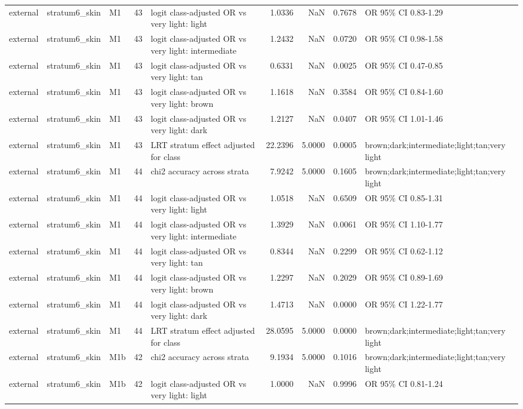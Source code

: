 \begin{tabular}{lllrlrrrl}
external & stratum6\_skin & M1 & 43 & logit class-adjusted OR vs very light: light & 1.0336 & NaN & 0.7678 & OR 95\% CI 0.83-1.29 \\
external & stratum6\_skin & M1 & 43 & logit class-adjusted OR vs very light: intermediate & 1.2432 & NaN & 0.0720 & OR 95\% CI 0.98-1.58 \\
external & stratum6\_skin & M1 & 43 & logit class-adjusted OR vs very light: tan & 0.6331 & NaN & 0.0025 & OR 95\% CI 0.47-0.85 \\
external & stratum6\_skin & M1 & 43 & logit class-adjusted OR vs very light: brown & 1.1618 & NaN & 0.3584 & OR 95\% CI 0.84-1.60 \\
external & stratum6\_skin & M1 & 43 & logit class-adjusted OR vs very light: dark & 1.2127 & NaN & 0.0407 & OR 95\% CI 1.01-1.46 \\
external & stratum6\_skin & M1 & 43 & LRT stratum effect adjusted for class & 22.2396 & 5.0000 & 0.0005 & brown;dark;intermediate;light;tan;very light \\
external & stratum6\_skin & M1 & 44 & chi2 accuracy across strata & 7.9242 & 5.0000 & 0.1605 & brown;dark;intermediate;light;tan;very light \\
external & stratum6\_skin & M1 & 44 & logit class-adjusted OR vs very light: light & 1.0518 & NaN & 0.6509 & OR 95\% CI 0.85-1.31 \\
external & stratum6\_skin & M1 & 44 & logit class-adjusted OR vs very light: intermediate & 1.3929 & NaN & 0.0061 & OR 95\% CI 1.10-1.77 \\
external & stratum6\_skin & M1 & 44 & logit class-adjusted OR vs very light: tan & 0.8344 & NaN & 0.2299 & OR 95\% CI 0.62-1.12 \\
external & stratum6\_skin & M1 & 44 & logit class-adjusted OR vs very light: brown & 1.2297 & NaN & 0.2029 & OR 95\% CI 0.89-1.69 \\
external & stratum6\_skin & M1 & 44 & logit class-adjusted OR vs very light: dark & 1.4713 & NaN & 0.0000 & OR 95\% CI 1.22-1.77 \\
external & stratum6\_skin & M1 & 44 & LRT stratum effect adjusted for class & 28.0595 & 5.0000 & 0.0000 & brown;dark;intermediate;light;tan;very light \\
external & stratum6\_skin & M1b & 42 & chi2 accuracy across strata & 9.1934 & 5.0000 & 0.1016 & brown;dark;intermediate;light;tan;very light \\
external & stratum6\_skin & M1b & 42 & logit class-adjusted OR vs very light: light & 1.0000 & NaN & 0.9996 & OR 95\% CI 0.81-1.24 \\

\end{tabular}

